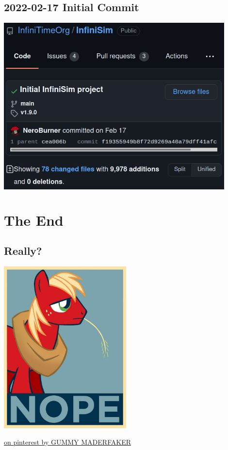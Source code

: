 \documentclass{beamer}
\begin{document}
\subsection{2022-02-17 Initial Commit}
\begin{frame}{}
  \centering\includegraphics[width=0.9\textwidth]{../2022-02-17_InfiniSim_initial_commit}
\end{frame}

\section{The End}
\subsection{Really?}
\begin{frame}{}
  \centering\includegraphics[width=0.5\textwidth]{../pony_big_mac_nope}

  \small \href{https://www.pinterest.fr/pin/517280707176866947/}{on pinterest by GUMMY MADERFAKER}
\end{frame}
\end{document}
